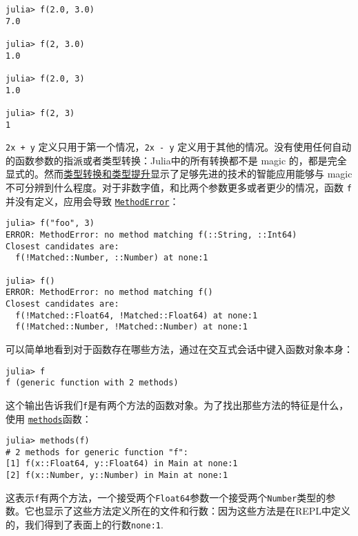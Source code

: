 \begin{verbatim}
julia> f(2.0, 3.0)
7.0

julia> f(2, 3.0)
1.0

julia> f(2.0, 3)
1.0

julia> f(2, 3)
1
\end{verbatim}



\texttt{2x + y} 定义只用于第一个情况，\texttt{2x - y} 定义用于其他的情况。没有使用任何自动的函数参数的指派或者类型转换：Julia中的所有转换都不是 magic 的，都是完全显式的。然而\hyperlink{10374023657104680331}{类型转换和类型提升}显示了足够先进的技术的智能应用能够与 magic 不可分辨到什么程度。\footnotemark[2] 对于非数字值，和比两个参数更多或者更少的情况，函数 \texttt{f} 并没有定义，应用会导致 \hyperlink{68769522931907606}{\texttt{MethodError}}：




\begin{verbatim}
julia> f("foo", 3)
ERROR: MethodError: no method matching f(::String, ::Int64)
Closest candidates are:
  f(!Matched::Number, ::Number) at none:1

julia> f()
ERROR: MethodError: no method matching f()
Closest candidates are:
  f(!Matched::Float64, !Matched::Float64) at none:1
  f(!Matched::Number, !Matched::Number) at none:1
\end{verbatim}



可以简单地看到对于函数存在哪些方法，通过在交互式会话中键入函数对象本身：




\begin{verbatim}
julia> f
f (generic function with 2 methods)
\end{verbatim}



这个输出告诉我们\texttt{f}是有两个方法的函数对象。为了找出那些方法的特征是什么，使用 \hyperlink{3025953302266245919}{\texttt{methods}}函数：




\begin{verbatim}
julia> methods(f)
# 2 methods for generic function "f":
[1] f(x::Float64, y::Float64) in Main at none:1
[2] f(x::Number, y::Number) in Main at none:1
\end{verbatim}



这表示\texttt{f}有两个方法，一个接受两个\texttt{Float64}参数一个接受两个\texttt{Number}类型的参数。它也显示了这些方法定义所在的文件和行数：因为这些方法是在REPL中定义的，我们得到了表面上的行数\texttt{none:1}.



